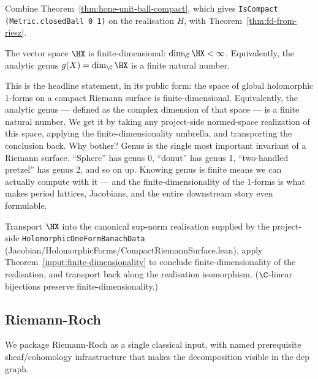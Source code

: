 \begin{proofsketch}
Combine Theorem~\ref{thm:hone-unit-ball-compact}, which gives
\texttt{IsCompact (Metric.closedBall 0 1)} on the realisation \(H\),
with Theorem~\ref{thm:fd-from-riesz}.
\end{proofsketch}

\begin{theorem}
\label{thm:fd-holomorphic-one-forms}
The vector space \(\HX\) is finite-dimensional:
\(\dim_{\C}\HX<\infty\). Equivalently, the analytic genus
\(g(X)=\dim_{\C}\HX\) is a finite natural number.
\leanok
\end{theorem}

\begin{layman}
This is the headline statement, in its public form: the space of global
holomorphic 1-forms on a compact Riemann surface is finite-dimensional.
Equivalently, the analytic genus — defined as the complex dimension of
that space — is a finite natural number. We get it by taking any
project-side normed-space realization of this space, applying the
finite-dimensionality umbrella, and transporting the conclusion back.
Why bother? Genus is the single most important invariant of a Riemann
surface. ``Sphere'' has genus 0, ``donut'' has genus 1, ``two-handled
pretzel'' has genus 2, and so on up. Knowing genus is finite means we
can actually compute with it — and the finite-dimensionality of the
1-forms is what makes period lattices, Jacobians, and the entire
downstream story even formulable.
\end{layman}

\begin{proofsketch}
Transport \(\HX\) into the canonical sup-norm realisation supplied by
the project-side \texttt{HolomorphicOneFormBanachData}
(Jacobian/HolomorphicForms/CompactRiemannSurface.lean), apply
Theorem~\ref{input:finite-dimensionality} to conclude
finite-dimensionality of the realisation, and transport back along
the realisation isomorphism. (\(\C\)-linear bijections preserve
finite-dimensionality.)
\end{proofsketch}

\subsection{Riemann-Roch}

We package Riemann-Roch as a single classical input, with named
prerequisite sheaf/cohomology infrastructure that makes the
decomposition visible in the dep graph.

